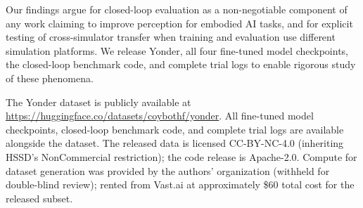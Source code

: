 \documentclass{article}
\begin{document}
Our findings argue for closed-loop evaluation as a non-negotiable component of any work claiming to improve perception for embodied AI tasks, and for explicit testing of cross-simulator transfer when training and evaluation use different simulation platforms. We release Yonder, all four fine-tuned model checkpoints, the closed-loop benchmark code, and complete trial logs to enable rigorous study of these phenomena.

\begin{ack}
The Yonder dataset is publicly available at \url{https://huggingface.co/datasets/coybothf/yonder}. All fine-tuned model checkpoints, closed-loop benchmark code, and complete trial logs are available alongside the dataset. The released data is licensed CC-BY-NC-4.0 (inheriting HSSD's NonCommercial restriction); the code release is Apache-2.0. Compute for dataset generation was provided by the authors' organization (withheld for double-blind review); rented from Vast.ai at approximately \$60 total cost for the released subset.
\end{ack}

\end{document}
